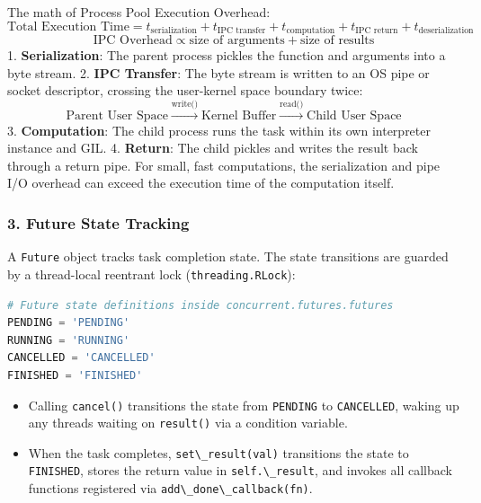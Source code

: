 The math of Process Pool Execution Overhead:
\[\text{Total Execution Time} = t_{\text{serialization}} + t_{\text{IPC transfer}} + t_{\text{computation}} + t_{\text{IPC return}} + t_{\text{deserialization}}\]
\[\text{IPC Overhead} \propto \text{size of arguments} + \text{size of results}\]
1. \textbf{Serialization}: The parent process pickles the function and
arguments into a byte stream. 2. \textbf{IPC Transfer}: The byte stream
is written to an OS pipe or socket descriptor, crossing the user-kernel
space boundary twice:
\[\text{Parent User Space} \xrightarrow{\text{write()}} \text{Kernel Buffer} \xrightarrow{\text{read()}} \text{Child User Space}\]
3. \textbf{Computation}: The child process runs the task within its own
interpreter instance and GIL. 4. \textbf{Return}: The child pickles and
writes the result back through a return pipe. For small, fast
computations, the serialization and pipe I/O overhead can exceed the
execution time of the computation itself.

\hypertarget{future-state-tracking}{%
\subsubsection{3. Future State Tracking}\label{future-state-tracking}}

A \passthrough{\lstinline!Future!} object tracks task completion state.
The state transitions are guarded by a thread-local reentrant lock
(\passthrough{\lstinline!threading.RLock!}):

\begin{lstlisting}[language=Python]
# Future state definitions inside concurrent.futures.futures
PENDING = 'PENDING'
RUNNING = 'RUNNING'
CANCELLED = 'CANCELLED'
FINISHED = 'FINISHED'
\end{lstlisting}

\begin{itemize}
\tightlist
\item
  Calling \passthrough{\lstinline!cancel()!} transitions the state from
  \passthrough{\lstinline!PENDING!} to
  \passthrough{\lstinline!CANCELLED!}, waking up any threads waiting on
  \passthrough{\lstinline!result()!} via a condition variable.
\item
  When the task completes, \passthrough{\lstinline!set\_result(val)!}
  transitions the state to \passthrough{\lstinline!FINISHED!}, stores
  the return value in \passthrough{\lstinline!self.\_result!}, and
  invokes all callback functions registered via
  \passthrough{\lstinline!add\_done\_callback(fn)!}.
\end{itemize}

